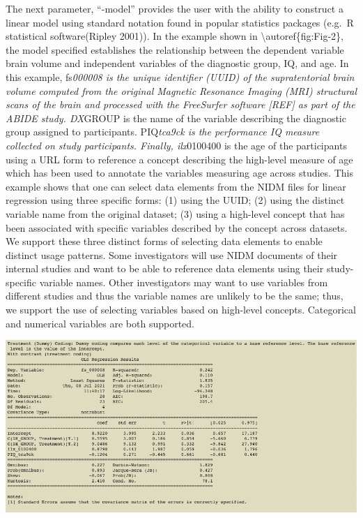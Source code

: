 The next parameter, ``-model'' provides the user with the ability to
construct a linear model using standard notation found in popular
statistics packages (e.g.~R statistical software(Ripley 2001)). In the
example shown in \textbackslash{}autoref\{fig:Fig-2\}, the model
specified establishes the relationship between the dependent variable
brain volume and independent variables of the diagnostic group, IQ, and
age. In this example, fs\emph{000008 is the unique identifier (UUID) of
the supratentorial brain volume computed from the original Magnetic
Resonance Imaging (MRI) structural scans of the brain and processed with
the FreeSurfer software {[}REF{]} as part of the ABIDE study. DX}GROUP
is the name of the variable describing the diagnostic group assigned to
participants. PIQ\emph{tca9ck is the performance IQ measure collected on
study participants. Finally, ilx}0100400 is the age of the participants
using a URL form to reference a concept describing the high-level
measure of age which has been used to annotate the variables measuring
age across studies. This example shows that one can select data elements
from the NIDM files for linear regression using three specific forms:
(1) using the UUID; (2) using the distinct variable name from the
original dataset; (3) using a high-level concept that has been
associated with specific variables described by the concept across
datasets. We support these three distinct forms of selecting data
elements to enable distinct usage patterns. Some investigators will use
NIDM documents of their internal studies and want to be able to
reference data elements using their study-specific variable names. Other
investigators may want to use variables from different studies and thus
the variable names are unlikely to be the same; thus, we support the use
of selecting variables based on high-level concepts. Categorical and
numerical variables are both supported.

\includegraphics{fig-3.png}

